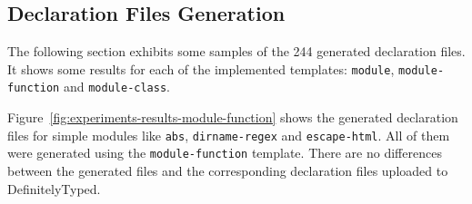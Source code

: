 \documentclass[a4paper,english,cleveref, autoref]{lipics-v2019}
\newcommand{\figref}[1]{Figure~\ref{#1}}
\begin{document}
\subsection{Declaration Files Generation} \label{sec:experiments-declaration-files-generation}

The following section exhibits some samples of the 244 generated declaration files. It shows some results for each of the implemented templates: \lstinline{module}, \lstinline{module-function} and \lstinline{module-class}.

\figref{fig:experiments-results-module-function} shows the generated declaration files for simple modules like \lstinline{abs}, \lstinline{dirname-regex} and \lstinline{escape-html}. All of them were generated using the \lstinline{module-function} template. There are no differences between the generated files and the corresponding declaration files uploaded to DefinitelyTyped.
\end{document}

